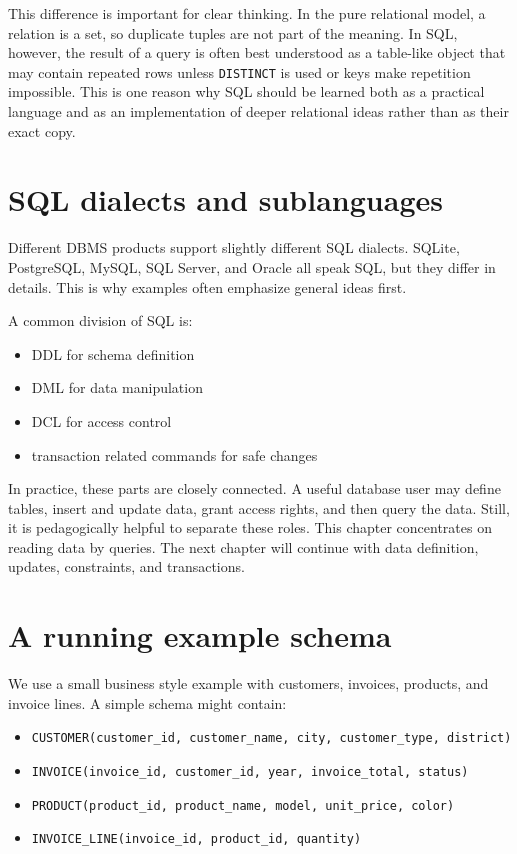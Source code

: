\documentclass[11pt,a4paper,openany]{book}
\begin{document}
This difference is important for clear thinking. In the pure relational model, a relation is a set, so duplicate tuples are not part of the meaning. In SQL, however, the result of a query is often best understood as a table-like object that may contain repeated rows unless \texttt{DISTINCT} is used or keys make repetition impossible. This is one reason why SQL should be learned both as a practical language and as an implementation of deeper relational ideas rather than as their exact copy.

\section{SQL dialects and sublanguages}
Different DBMS products support slightly different SQL dialects. SQLite, PostgreSQL, MySQL, SQL Server, and Oracle all speak SQL, but they differ in details. This is why examples often emphasize general ideas first.

A common division of SQL is:
\begin{itemize}
\item DDL for schema definition
\item DML for data manipulation
\item DCL for access control
\item transaction related commands for safe changes
\end{itemize}

In practice, these parts are closely connected. A useful database user may define tables, insert and update data, grant access rights, and then query the data. Still, it is pedagogically helpful to separate these roles. This chapter concentrates on reading data by queries. The next chapter will continue with data definition, updates, constraints, and transactions.

\section{A running example schema}
We use a small business style example with customers, invoices, products, and invoice lines. A simple schema might contain:

\begin{itemize}
\item \texttt{CUSTOMER(customer\_id, customer\_name, city, customer\_type, district)}
\item \texttt{INVOICE(invoice\_id, customer\_id, year, invoice\_total, status)}
\item \texttt{PRODUCT(product\_id, product\_name, model, unit\_price, color)}
\item \texttt{INVOICE\_LINE(invoice\_id, product\_id, quantity)}
\end{itemize}
\end{document}
